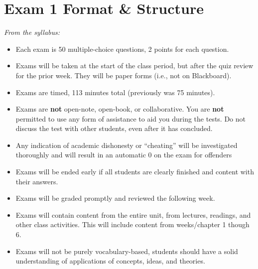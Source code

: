 \documentclass[
  12pt,
  letterpaper,
]{scrartcl}
\renewcommand*\contentsname{Table of contents}
\newcommand\contentsname{Table of contents}
\begin{document}


\pagestyle{scrheadings}

\frenchspacing %

\renewcommand*\contentsname{Table of Contents}
{
\hypersetup{linkcolor=}
\setcounter{tocdepth}{2}
\tableofcontents
}

\newpage{}

\section{Exam 1 Format \& Structure}\label{sec-format}

\emph{From the syllabus:}

\begin{itemize}
\item
  Each exam is 50 multiple-choice questions, 2 points for each question.
\item
  Exams will be taken at the start of the class period, but after the
  quiz review for the prior week. They will be paper forms (i.e., not on
  Blackboard).
\item
  Exams are timed, 113 minutes total (previously was 75 minutes).
\item
  Exams are \textbf{not} open-note, open-book, or collaborative. You are
  \textbf{not} permitted to use any form of assistance to aid you during
  the tests. Do not discuss the test with other students, even after it
  has concluded.
\item
  Any indication of academic dishonesty or ``cheating'' will be
  investigated thoroughly and will result in an automatic 0 on the exam
  for offenders
\item
  Exams will be ended early if all students are clearly finished and
  content with their answers.
\item
  Exams will be graded promptly and reviewed the following week.
\item
  Exams will contain content from the entire unit, from lectures,
  readings, and other class activities. This will include content from
  weeks/chapter 1 though 6.
\item
  Exams will not be purely vocabulary-based, students should have a
  solid understanding of applications of concepts, ideas, and theories.
\end{itemize}
\end{document}
